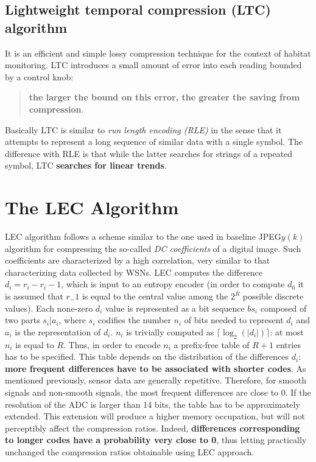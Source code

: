 \subsection{Lightweight temporal compression (LTC) algorithm}

It is an efficient and simple \textcolor[rgb]{1,0,0}{lossy compression} technique for the \textcolor[rgb]{1,0,0}{context of habitat monitoring}. LTC introduces a small amount of error into each reading bounded by a control knob: 
\begin{quote}
    \textbf{\textcolor[rgb]{1,0,0}{the larger the bound on this error, the greater the saving from compression}}. 
\end{quote}
Basically LTC is similar to \emph{\textcolor[rgb]{1,0,0}{run length encoding (RLE)}} in the sense that \textcolor[rgb]{1,0,0}{it attempts to represent a long sequence of similar data with a single symbol}. The difference with RLE is that while the latter searches for strings of a repeated symbol, LTC \textbf{\textcolor[rgb]{1,0,0}{searches for linear trends}}. 


\section{The LEC Algorithm}

LEC algorithm follows a scheme similar to the one used in baseline JPEG$y(k)$ algorithm for compressing the so-called \emph{DC coefficients} of a digital image. Such coefficients are characterized by a high correlation, very similar to that characterizing data collected by WSNs. LEC computes the difference $d_i = r_i - r_i-1$, which is input to an entropy encoder (in order to compute $d_0$ it is assumed that $r_-1$ is equal to the central value among the $2^R$ possible discrete values). Each none-zero $d_i$ value is represented as a bit sequence $bs_i$ composed of two parts $s_i | a_i$, where $s_i$ codifies the number $n_i$ of bits needed to represent $d_i$ and $a_i$ is the representation of $d_i$. $n_i$ is trivially computed as $\lceil\log_2(|d_i|)\rceil$: at most $n_i$ is equal to $R$. Thus, in order to encode $n_i$ a prefix-free table of $R+1$ entries has to be specified. This table depends on the distribution of the differences $d_i$: \textbf{\textcolor[rgb]{1,0,0}{more frequent differences have to be associated with shorter codes}}. As mentioned previously, sensor data are generally repetitive. Therefore, for smooth signals and non-smooth signals, the most frequent differences are close to 0. If the resolution of the ADC is \textcolor[rgb]{1,0,0}{larger than 14 bits}, the table has to be approximately extended. This extension will produce a \textcolor[rgb]{0,0,1}{higher memory occupation}, but will not \textcolor[rgb]{1,0,0}{perceptibly affect the compression ratios}. Indeed, \textbf{\textcolor[rgb]{1,0,0}{differences corresponding to longer codes have a probability very close to 0}}, thus letting practically unchanged the compression ratios obtainable using LEC approach. 

